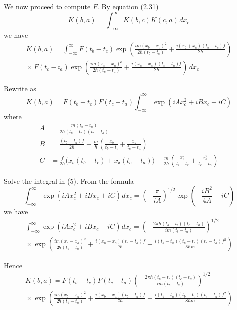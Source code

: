 \documentclass[12pt]{article}
\begin{document}
We now proceed to compute $F$. By equation (2.31)
\begin{equation*}
K(b,a)=\int_{-\infty}^\infty K(b,c)K(c,a)\,dx_c
\end{equation*}
we have
\begin{multline*}
K(b,a)=\int_{-\infty}^\infty
F(t_b-t_c)\exp\left(\frac{im(x_b-x_c)^2}{2\hbar(t_b-t_c)}+\frac{i(x_b+x_c)(t_b-t_c)f}{2\hbar}\right)
\\
{}\times F(t_c-t_a)\exp\left(\frac{im(x_c-x_a)^2}{2\hbar(t_c-t_a)}+\frac{i(x_c+x_a)(t_c-t_a)f}{2\hbar}\right)
\,dx_c
\tag{4}
\end{multline*}


Rewrite as
\begin{equation*}
K(b,a)=F(t_b-t_c)F(t_c-t_a)\int_{-\infty}^\infty
\exp(iAx_c^2+iBx_c+iC)
\tag{5}
\end{equation*}
where
\begin{align*}
A&=\frac{m(t_b-t_a)}{2\hbar(t_b-t_c)(t_c-t_a)}
\tag{6}
\\
B&=\frac{(t_b-t_a)f}{2\hbar}-\frac{m}{\hbar}\left(\frac{x_b}{t_b-t_c}+\frac{x_a}{t_c-t_a}\right)
\tag{7}
\\
C&=\frac{f}{2\hbar}\big(x_b(t_b-t_c)+x_a(t_c-t_a)\big)+\frac{m}{2\hbar}
\left(\frac{x_b^2}{t_b-t_c}+\frac{x_a^2}{t_c-t_a}\right)
\tag{8}
\end{align*}


Solve the integral in (5). From the formula
\begin{equation*}
\int_{-\infty}^{\infty}\exp(iAx_c^2+iBx_c+iC)\,dx_c
=\left(-\frac{\pi}{iA}\right)^{1/2}
\exp\left(-\frac{iB^2}{4A}+iC\right)
\end{equation*}
we have
{\footnotesize
\begin{multline*}
\int_{-\infty}^{\infty}\exp(iAx_c^2+iBx_c+iC)\,dx_c
=\left(-\frac{2\pi\hbar(t_b-t_c)(t_c-t_a)}{im(t_b-t_a)}\right)^{1/2}
\\
{}\times\exp\left(
\frac{im(x_b-x_a)^2}{2\hbar(t_b-t_a)}
+\frac{i(x_b+x_a)(t_b-t_a)f}{2\hbar}
-\frac{i(t_b-t_a)(t_b-t_c)(t_c-t_a)f^2}{8\hbar m}
\right)
\end{multline*}
}


Hence
{\footnotesize
\begin{multline*}
K(b,a)=F(t_b-t_c)F(t_c-t_a)
\left(-\frac{2\pi\hbar(t_b-t_c)(t_c-t_a)}{im(t_b-t_a)}\right)^{1/2}
\\
{}\times \exp\left(
\frac{im(x_b-x_a)^2}{2\hbar(t_b-t_a)}
+\frac{i(x_b+x_a)(t_b-t_a)f}{2\hbar}
-\frac{i(t_b-t_a)(t_b-t_c)(t_c-t_a)f^2}{8\hbar m}
\right)
\tag{9}
\end{multline*}
}
\end{document}
